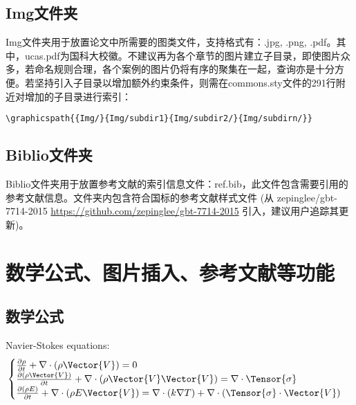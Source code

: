\subsection{Img文件夹}

Img文件夹用于放置论文中所需要的图类文件，支持格式有：.jpg, .png, .pdf。其中，ucas.pdf为国科大校徽。不建议再为各个章节的图片建立子目录，即使图片众多，若命名规则合理，各个案例的图片仍将有序的聚集在一起，查询亦是十分方便。若坚持引入子目录以增加额外约束条件，则需在commons.sty文件的291行附近对增加的子目录进行索引：

\verb|\graphicspath{{Img/}{Img/subdir1}{Img/subdir2/}{Img/subdirn/}}|

\subsection{Biblio文件夹}

Biblio文件夹用于放置参考文献的索引信息文件：ref.bib，此文件包含需要引用的参考文献信息。文件夹内包含符合国标的参考文献样式文件 (从 zepinglee/gbt-7714-2015 \url{https://github.com/zepinglee/gbt-7714-2015} 引入，建议用户追踪其更新)。

\section{数学公式、图片插入、参考文献等功能}

\subsection{数学公式}

Navier-Stokes equations:
\begin{equation} \label{eq:ns}
    \begin{cases}
        \frac{\partial \rho}{\partial t} + \nabla\cdot(\rho\Vector{V}) = 0 \\
        \frac{\partial (\rho\Vector{V})}{\partial t} + \nabla\cdot(\rho\Vector{V}\Vector{V}) = \nabla\cdot\Tensor{\sigma}\\
        \frac{\partial (\rho E)}{\partial t} + \nabla\cdot(\rho E\Vector{V}) = \nabla\cdot(k\nabla T) + \nabla\cdot(\Tensor{\sigma}\cdot\Vector{V})
    \end{cases}
\end{equation}

